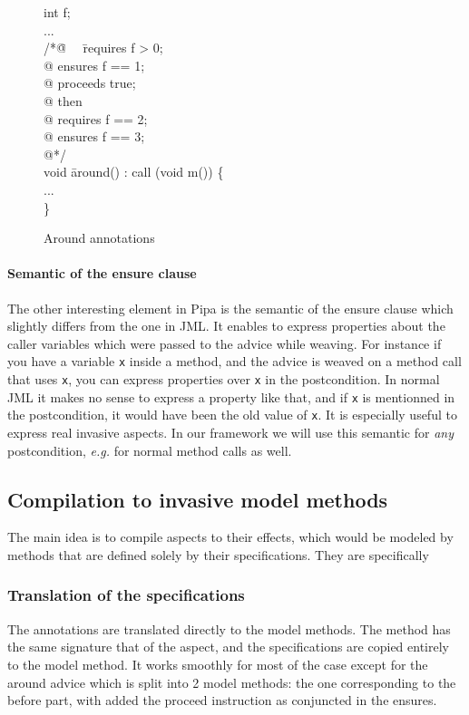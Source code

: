 \documentclass[draft]{llncs}
\begin{document}
\begin{figure}
\begin{center}\begin{minipage}{3cm}\bcode
int f;\\
...\\
/*\=@ \ \ \=requires f > 0;\+ \\
@ \>ensures f == 1;\\
@ \>proceeds true;\\
@ then\\
@ \> requires f == 2;\\
@ \> ensures f == 3;\\
@*/\-\\
void \= around() : call (void m()) \{\\
\>...\\
\} \ecode\end{minipage}\end{center}
\caption{Around annotations}
\label{arround_annot}
\end{figure}
\paragraph{Semantic of the ensure clause}
The other interesting element in Pipa is the semantic of the ensure clause which slightly differs from the one in
JML. It enables to express properties about the caller variables which were passed to the advice while 
weaving. For instance if you have a variable {\tt x} inside a method, 
and the advice is weaved on a method call that uses {\tt x}, you can express properties over {\tt x} in the 
postcondition. In normal JML it makes no sense to express a property like that, and if {\tt x} is mentionned
in the postcondition, it would have been the old value of {\tt x}. It is especially useful to express real 
invasive aspects. In our framework we will use this semantic for {\it any} postcondition, {\it e.g.} 
for normal method calls as well.

\subsection{Compilation to invasive model methods}
The main idea is to compile aspects to their effects, which would be modeled by methods that are defined
solely by their specifications. 
They are specifically
\subsubsection{Translation of the specifications}
The annotations are translated directly to the model methods. The method has the same signature
that of the aspect, and the specifications are copied entirely to the model method. It works smoothly
for most of the case except for the around advice which is split into 2 model methods: the one corresponding
to the before part, with added the proceed instruction as conjuncted in the ensures.
\end{document}
